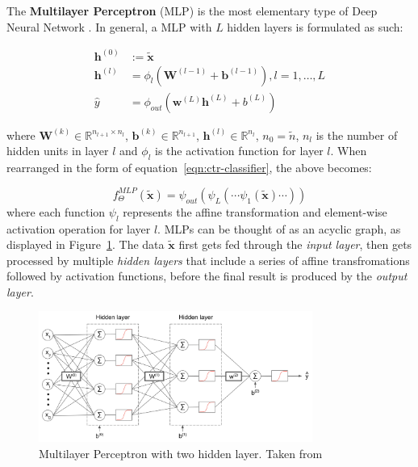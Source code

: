 \documentclass{mldsmsc}
\begin{document}
The \textbf{Multilayer Perceptron} (MLP) \label{ref:mlp} is the most elementary type of Deep Neural Network
\citep{RefWorks:webster2024week}. In general, a MLP with $L$ hidden layers is formulated as such:

\begin{align}
\label{eqn:mlp}
\mathbf{h}^{(0)} &:= \tilde{\mathbf{x}} \\
\mathbf{h}^{(l)} &= \phi_{l} \left( \mathbf{W}^{(l-1)} + \mathbf{b}^{(l-1)} \right), l = 1, \ldots, L \\
\hat{y} &= \phi_{out} \left( \mathbf{w}^{(L)} \mathbf{h}^{(L)} + b^{(L)} \right)
\end{align}

where $\mathbf{W}^{(k)} \in \mathbb{R}^{n_{l+1} \times n_l } $, $\mathbf{b}^{(k)} \in \mathbb{R}^{n_{l+1}}$,
$\mathbf{h}^{(l)} \in \mathbb{R}^{n_l}$, $n_0 = \tilde{n}$, $n_l$ is the number of hidden
units in layer $l$ and $\phi_{l}$ is the activation function for layer $l$.
When rearranged in the form of equation~\ref{eqn:ctr-classifier}, the above becomes:

\begin{equation}
\label{eqn:mlp-2}
f_{\Theta}^{MLP}(\tilde{\mathbf{x}}) = \psi_{out} \left( \psi_{L} \left( \cdots \psi_{1} \left( 
    \tilde{\mathbf{x}} \right) \cdots \right) \right)
\end{equation}
where each function $\psi_{l}$ represents the affine transformation and element-wise activation
operation for layer $l$. MLPs can be thought of as an acyclic graph, as displayed in
Figure~\ref{fig:mlp}. The data $\tilde{\mathbf{x}}$ first gets fed through the
\emph{input layer}, then gets processed by multiple \emph{hidden layers} that include
a series of affine transfromations followed by activation functions, before the final
result is produced by the \emph{output layer}.

\begin{figure}[h]
    \centering
    \includegraphics[width=0.8\textwidth]{../figures/ann_two_hidden_layers.png}
    \caption{Multilayer Perceptron with two hidden layer. Taken from \citep{RefWorks:webster2024week}}
    \label{fig:mlp}
\end{figure}
\end{document}
